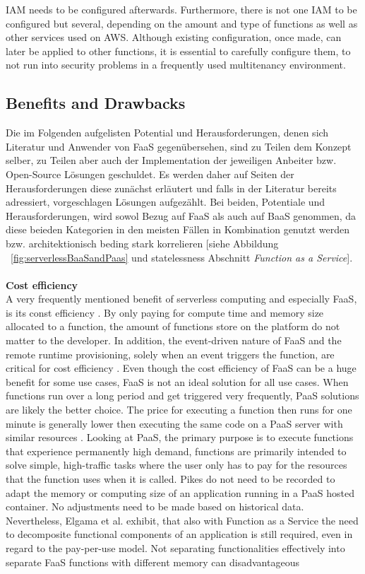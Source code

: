 \documentclass[11pt]{article}
\begin{document}
IAM needs to be configured afterwards. Furthermore, there is not one IAM to be configured but several, depending on the amount and type of functions as well as other services used on AWS. Although existing configuration, once made, can later be applied to other functions, it is essential to carefully configure them, to not run into security problems in a frequently used multitenancy environment.


\subsection{Benefits and Drawbacks}
Die im Folgenden aufgelisten Potential und Herausforderungen, denen sich Literatur und Anwender von FaaS gegenübersehen, sind zu Teilen dem Konzept selber, zu Teilen aber auch der Implementation der jeweiligen Anbeiter bzw. Open-Source Lösungen geschuldet. Es werden daher auf Seiten der Herausforderungen diese zunächst erläutert und falls in der Literatur bereits adressiert, vorgeschlagen Lösungen aufgezählt. Bei beiden, Potentiale und Herausforderungen, wird sowol Bezug auf FaaS als auch auf BaaS genommen, da diese beieden Kategorien in den meisten Fällen in Kombination genutzt werden bzw. architektionisch beding stark korrelieren [siehe Abbildung ~\ref{fig:serverlessBaaSandPaas} und \glqq statelessness\grqq{} Abschnitt \textit{Function as a Service}].\\\\ \textbf{Cost efficiency}\\ A very frequently mentioned benefit of serverless computing and especially FaaS, is its const efficiency \cite{lee2018evaluation}. By only paying for compute time and memory size allocated to a function, the amount of functions store on the platform do not matter to the developer. In addition, the event-driven nature of FaaS and the remote runtime provisioning, solely when an event triggers the function, are critical for cost efficiency \cite{feng2018exploring}. Even though the cost efficiency of FaaS can be a huge benefit for some use cases, FaaS is not an ideal solution for all use cases. When functions run over a long period and get triggered very frequently, PaaS solutions are likely the better choice. The price for executing a function then runs for one minute is generally lower then executing the same code on a PaaS server with similar resources \cite{jonas2019cloud}. Looking at PaaS, the primary purpose is to execute functions that experience permanently high demand, functions are primarily intended to solve simple, high-traffic tasks where the user only has to pay for the resources that the function uses when it is called. Pikes do not need to be recorded to adapt the memory or computing size of an application running in a PaaS hosted container. No adjustments need to be made based on historical data. Nevertheless, Elgama et al. exhibit, that also with Function as a Service the need to decomposite functional components of an application is still required, even in regard to the pay-per-use model. Not separating functionalities effectively into separate FaaS functions with different memory can disadvantageous 
\end{document}
